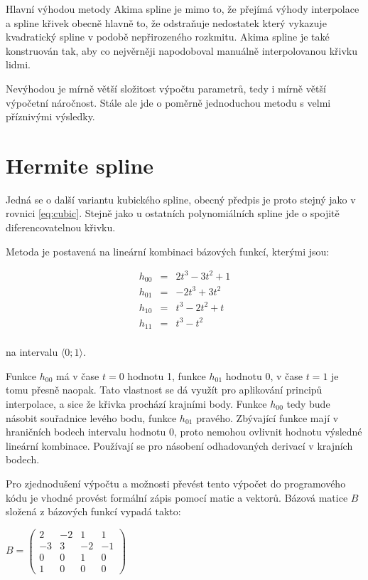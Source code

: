 \documentclass[]{thesiskiv}
\begin{document}
Hlavní výhodou metody Akima spline je mimo to, že přejímá výhody interpolace a spline křivek obecně hlavně to, že odstraňuje nedostatek který vykazuje kvadratický spline v podobě nepřirozeného rozkmitu. Akima spline je také konstruován tak, aby co nejvěrněji napodoboval manuálně interpolovanou křivku lidmi.

Nevýhodou je mírně větší složitost výpočtu parametrů, tedy i mírně větší výpočetní náročnost. Stále ale jde o poměrně jednoduchou metodu s velmi příznivými výsledky.

\section{Hermite spline}

Jedná se o další variantu kubického spline, obecný předpis je proto stejný jako v rovnici \ref{eq:cubic}. Stejně jako u ostatních polynomiálních spline jde o spojitě diferencovatelnou křivku.

Metoda je postavená na lineární kombinaci bázových funkcí, kterými jsou:

\begin{equation}
\begin{array}{rcl}
 h_{00} & = & 2t^3 - 3t^2 + 1 \\
 h_{01} & = & -2t^3 + 3t^2 \\
 h_{10} & = & t^3 - 2t^2 + t \\
 h_{11} & = & t^3 - t^2 \\
\end{array}
\end{equation}

na intervalu $\langle0;1\rangle$.

Funkce $h_{00}$ má v čase $t = 0$ hodnotu 1, funkce $h_{01}$ hodnotu 0, v čase $t = 1$ je tomu přesně naopak. Tato vlastnost se dá využít pro aplikování principů interpolace, a sice že křivka prochází krajními body. Funkce $h_{00}$ tedy bude násobit souřadnice levého bodu, funkce $h_{01}$ pravého. Zbývající funkce mají v hraničních bodech intervalu hodnotu 0, proto nemohou ovlivnit hodnotu výsledné lineární kombinace. Používají se pro násobení odhadovaných derivací v krajních bodech.

Pro zjednodušení výpočtu a možnosti převést tento výpočet do programového kódu je vhodné provést formální zápis pomocí matic a vektorů. Bázová matice $B$ složená z bázových funkcí vypadá takto:

\begin{center}
\begin{math}
B = 
 \begin{pmatrix}
  2 & -2 & 1 & 1 \\
  -3 & 3 & -2 & -1 \\
  0 & 0 & 1 & 0 \\
  1 & 0 & 0 & 0
 \end{pmatrix}
\end{math}
\end{center}
\end{document}
